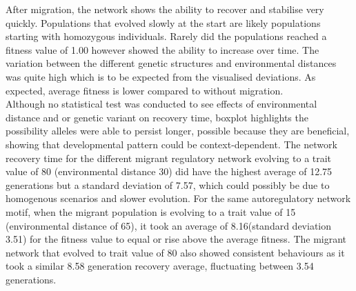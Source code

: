 After migration, the network shows the ability to recover and stabilise very quickly. Populations that evolved slowly at the start are likely populations starting with homozygous individuals. Rarely did the populations reached a fitness value of 1.00 however showed the ability to increase over time. The variation between the different genetic structures and environmental distances was quite high which is to be expected from the visualised deviations. As expected, average fitness is lower compared to without migration.\\
Although no statistical test was conducted to see effects of environmental distance and or genetic variant on recovery time, boxplot highlights the possibility alleles were able to persist longer, possible because they are beneficial, showing that developmental pattern could be context-dependent. The network recovery time for the different migrant regulatory network evolving to a trait value of 80 (environmental distance 30) did have the highest average of 12.75 generations but a standard deviation of 7.57, which could possibly be due to homogenous scenarios and slower evolution. For the same autoregulatory network motif, when the migrant population is evolving to a trait value of 15 (environmental distance of 65), it took an average of 8.16(standard deviation 3.51)  for the fitness value to equal or rise above the average fitness. The migrant network that evolved to trait value of 80 also showed consistent behaviours as it took a similar 8.58 generation recovery average, fluctuating between 3.54 generations.

